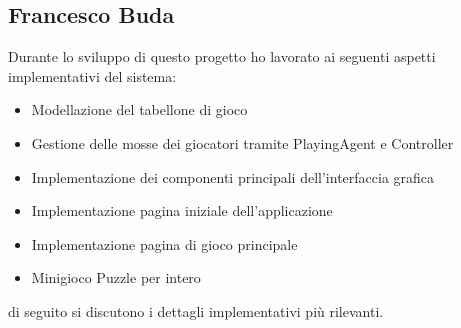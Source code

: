 \subsection{Francesco Buda} \label{sec:implementation-buda}
Durante lo sviluppo di questo progetto ho lavorato ai seguenti aspetti implementativi del sistema:
\begin{itemize}
    \item Modellazione del tabellone di gioco
    \item Gestione delle mosse dei giocatori tramite PlayingAgent e Controller
    \item Implementazione dei componenti principali dell'interfaccia grafica
    \item Implementazione pagina iniziale dell'applicazione
    \item Implementazione pagina di gioco principale
    \item Minigioco Puzzle per intero
\end{itemize}
di seguito si discutono i dettagli implementativi più rilevanti.

